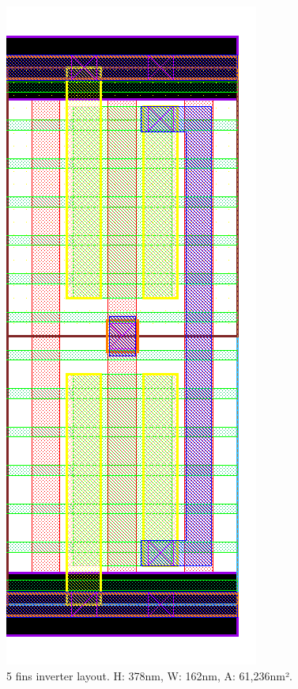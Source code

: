 \documentclass[diss,pgmicro,english]{iiufrgs}
\begin{document}
\begin{figure}[]
\centering
\includegraphics[width=\textwidth,height=\textheight,keepaspectratio]{INV5F.png}
\caption{5 fins inverter layout. H: 378nm, W: 162nm, A: 61,236nm².}
\label{fig:INV5F}
\end{figure}
\end{document}
